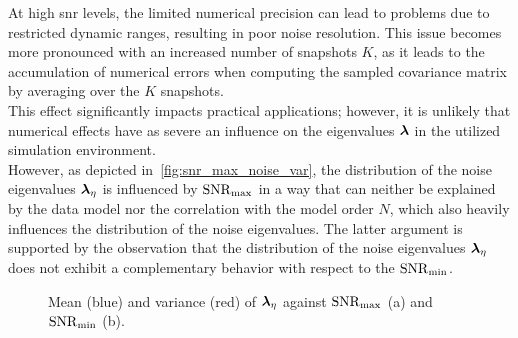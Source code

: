 At high \gls{snr} levels, the limited numerical precision can lead to problems due to restricted dynamic ranges,
resulting in poor noise resolution. This issue becomes more pronounced with an increased number of snapshots \( K \),
as it leads to the accumulation of numerical errors when computing the sampled covariance matrix by averaging over the
\( K \) snapshots.\\
This effect significantly impacts practical applications; however, it is unlikely that numerical effects have as severe
an influence on the eigenvalues \( \boldsymbol{\lambda} \) in the utilized simulation environment. \\
However, as depicted in~\autoref{fig:snr_max_noise_var}, the distribution of the noise eigenvalues \( \boldsymbol{\lambda}_{\eta} \) is
influenced by \( \mathrm{SNR}_{\max} \) in a way that can neither be explained by the data model nor the correlation with the model
order \( N \), which also heavily influences the distribution of the noise eigenvalues.
The latter argument is supported by the observation that the distribution of the noise eigenvalues \( \boldsymbol{\lambda}_{\eta} \) does
not exhibit a complementary behavior with respect to the \( \mathrm{SNR}_{\min} \).

\begin{figure}[H]
    \centering
    \caption{Mean (blue) and variance (red) of \( \boldsymbol{\lambda}_{\eta} \) against \( \mathrm{SNR}_{\max} \) (a) and \( \mathrm{SNR}_{\min} \) (b).}%
    \label{fig:snr_max_noise_var}
\end{figure}

